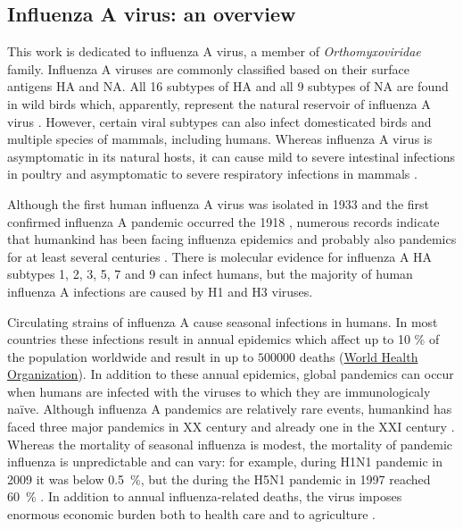 \subsection{Influenza A virus: an overview}
	
	This work is dedicated to influenza A virus, a member of  \textit{Orthomyxoviridae} family. Influenza A viruses are commonly classified based on their surface antigens \gls{HA} and \gls{NA}. All 16 subtypes of \gls{HA} and all 9 subtypes of \gls{NA} are found in wild birds which, apparently, represent the natural reservoir of influenza A virus \parencite{Stallknecht2007}. However, certain viral subtypes can also infect domesticated birds and multiple species of mammals, including humans. Whereas influenza A virus is asymptomatic in its natural hosts, it can cause mild to severe intestinal infections in poultry and asymptomatic to severe respiratory infections in mammals \parencite{Webster1992a}. 
	
	Although the first human influenza A virus was isolated in 1933 \parencite{Smith1933} and the first confirmed influenza A pandemic occurred the 1918 \parencite{Taubenberger1997}, numerous records indicate that humankind has been facing influenza epidemics and probably also pandemics for at least several centuries \parencite{Potter2001}. There is molecular evidence for influenza A \gls{HA} subtypes 1, 2, 3, 5, 7 and 9 can infect humans, but the  majority of human influenza A infections are caused by H1 and H3 viruses.
	
	Circulating strains of influenza A cause seasonal infections in humans. In most countries these infections result in annual epidemics which affect up to 10 \% of the population worldwide and result in up to $500000$ deaths (\hyperlink{www.who.in}{World Health Organization}). In addition to these annual epidemics, global pandemics can occur when humans are infected with the viruses to which they are immunologicaly na\"{i}ve. Although influenza A pandemics are relatively rare events, humankind has faced three major pandemics in XX century and already one in the XXI century \parencite{Lagace-Wiens2010, Fineberg2014}.  Whereas the mortality of seasonal influenza is modest, the mortality of pandemic influenza is unpredictable and can vary: for example, during H1N1 pandemic in 2009 it was below 0.5~\%, but the during the H5N1 pandemic in 1997 reached 60~\% \parencite{Forrest2010, Noah2013}. In addition to annual influenza-related deaths, the virus imposes enormous economic burden both to health care and to agriculture \parencite{Szucs1999, Noah2013}. 
	
